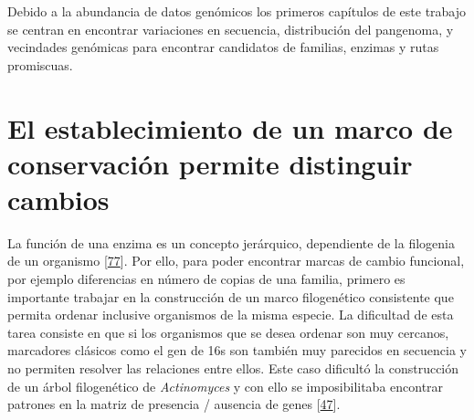 \documentclass[12pt,twoside]{reedthesis}
\begin{document}
  Debido a la abundancia de datos genómicos los primeros capítulos de este
  trabajo se centran en encontrar variaciones en secuencia, distribución
  del pangenoma, y vecindades genómicas para encontrar candidatos de
  familias, enzimas y rutas promiscuas.\\
  
  \section{El establecimiento de un marco de conservación permite
  distinguir
  cambios}\label{el-establecimiento-de-un-marco-de-conservacion-permite-distinguir-cambios}
  
  La función de una enzima es un concepto jerárquico, dependiente de la
  filogenia de un organismo
  {[}\protect\hyperlink{ref-szklarczyk_string_2015}{77}{]}. Por ello, para
  poder encontrar marcas de cambio funcional, por ejemplo diferencias en
  número de copias de una familia, primero es importante trabajar en la
  construcción de un marco filogenético consistente que permita ordenar
  inclusive organismos de la misma especie. La dificultad de esta tarea
  consiste en que si los organismos que se desea ordenar son muy cercanos,
  marcadores clásicos como el gen de 16s son también muy parecidos en
  secuencia y no permiten resolver las relaciones entre ellos. Este caso
  dificultó la construcción de un árbol filogenético de \emph{Actinomyces}
  y con ello se imposibilitaba encontrar patrones en la matriz de
  presencia / ausencia de genes
  {[}\protect\hyperlink{ref-juarez-vazquez_evolution_2017}{47}{]}.
  
\end{document}

